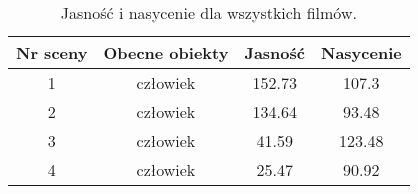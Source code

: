 \begin{table}[H]
\centering
\caption{Jasność i nasycenie dla wszystkich filmów.}
\begin{tabular}{|c|c|c|c|}
\hline
Nr sceny & Obecne obiekty & Jasność & Nasycenie \\ \hline
1        & człowiek       & 152.73  & 107.3     \\ \hline
2        & człowiek       & 134.64  & 93.48     \\ \hline
3        & człowiek       & 41.59   & 123.48    \\ \hline
4        & człowiek       & 25.47   & 90.92     \\ \hline
\end{tabular}

\label{tab:saturacja-jasnosc-czlowiek}
\end{table}